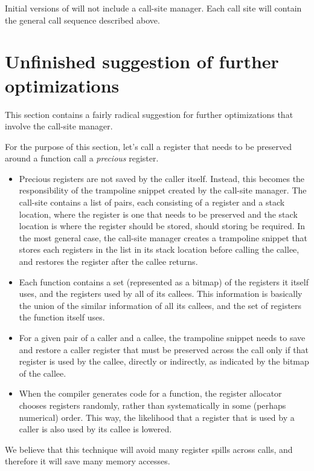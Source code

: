Initial versions of \sysname{} will not include a call-site manager.
Each call site will contain the general call sequence described
above.

\section{Unfinished suggestion of further optimizations}

This section contains a fairly radical suggestion for further
optimizations that involve the call-site manager.

For the purpose of this section, let's call a register that needs to
be preserved around a function call a \emph{precious} register.

\begin{itemize}
\item Precious registers are not saved by the caller itself.  Instead,
  this becomes the responsibility of the trampoline snippet created by
  the call-site manager.  The call-site contains a list of pairs, each
  consisting of a register and a stack location, where the register is
  one that needs to be preserved and the stack location is where the
  register should be stored, should storing be required.  In the most
  general case, the call-site manager creates a trampoline snippet
  that stores each registers in the list in its stack location before
  calling the callee, and restores the register after the callee
  returns.
\item Each function contains a set (represented as a bitmap) of the
  registers it itself uses, and the registers used by all of its
  callees.  This information is basically the union of the similar
  information of all its callees, and the set of registers the
  function itself uses.
\item For a given pair of a caller and a callee, the trampoline
  snippet needs to save and restore a caller register that must be
  preserved across the call only if that register is used by the
  callee, directly or indirectly, as indicated by the bitmap of the
  callee.
\item When the compiler generates code for a function, the register
  allocator chooses registers randomly, rather than systematically in
  some (perhaps numerical) order.  This way, the likelihood that a
  register that is used by a caller is also used by its callee is
  lowered.
\end{itemize}

We believe that this technique will avoid many register spills across
calls, and therefore it will save many memory accesses.

